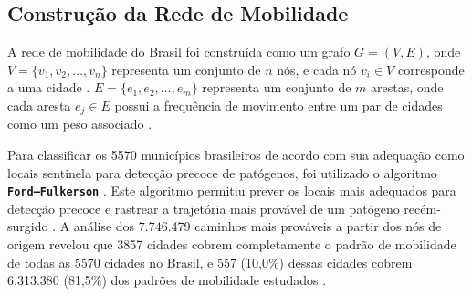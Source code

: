 \documentclass[preprint,12pt]{elsarticle}
\begin{document}
\subsection{Construção da Rede de Mobilidade}
A rede de mobilidade do Brasil foi construída como um grafo $G=(V, E)$, onde $V=\{v_1, v_2, \ldots, v_n\}$ representa um conjunto de $n$ nós, e cada nó $v_i \in V$ corresponde a uma cidade \cite{oliveira2024construction}. $E=\{e_1, e_2, \ldots, e_m\}$ representa um conjunto de $m$ arestas, onde cada aresta $e_j \in E$ possui a frequência de movimento entre um par de cidades como um peso associado \cite{oliveira2024construction}.

Para classificar os 5570 municípios brasileiros de acordo com sua adequação como locais sentinela para detecção precoce de patógenos, foi utilizado o algoritmo \textbf{\texttt{Ford--Fulkerson}} \cite{oliveira2024summary, ford1956maximal}. Este algoritmo permitiu prever os locais mais adequados para detecção precoce e rastrear a trajetória mais provável de um patógeno recém-surgido \cite{oliveira2024summary}. A análise dos 7.746.479 caminhos mais prováveis a partir dos nós de origem revelou que 3857 cidades cobrem completamente o padrão de mobilidade de todas as 5570 cidades no Brasil, e 557 (10,0\%) dessas cidades cobrem 6.313.380 (81,5\%) dos padrões de mobilidade estudados \cite{oliveira2024findings}.
\end{document}
